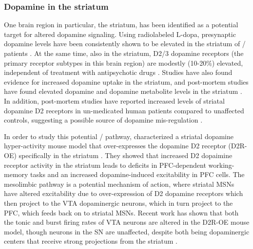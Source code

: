 

\subsubsection{Dopamine in the striatum}
One brain region in particular, the striatum, has been identified as a potential target for altered dopamine signaling.
Using radiolabeled L-dopa, presynaptic dopamine levels have been consistently shown to be elevated in the striatum of \scz/ patients \citep[reviewed in][]{Howes2007}.
At the same time, also in the striatum, D2/3 dopamine receptors (the primary receptor subtypes in this brain region) are modestly (10-20\%) elevated, independent of treatment with antipsychotic drugs \citep[reviewed in][]{Howes2009}.
Studies have also found evidence for increased dopamine uptake in the striatum, and post-mortem studies have found elevated dopamine and dopamine metabolite levels in the striatum \citep{Simpson2010}.
In addition, post-mortem studies have reported increased levels of striatal dopamine D2 receptors in un-medicated human patients compared to unaffected controls, suggesting a possible source of dopamine mis-regulation \citep{Cross1981}.

In order to study this potential \scz/ pathway, \citeauthor{Kellendonk2006} characterized a striatal dopamine hyper-activity mouse model that over-expresses the dopamine D2 receptor (D2R-OE) specifically in the striatum \citep{Kellendonk2006}.
They showed that increased D2 dopaimine receptor activity in the striatum leads to deficits in \ac{PFC}-dependent working-memory tasks and an increased dopamine-induced excitability in \ac{PFC} cells.
The mesolimbic pathway is a potential mechanism of action, where striatal \acp{MSN} have altered excitability due to over-expression of D2 dopamine receptors which then project to the \ac{VTA} dopaminergic neurons, which in turn project to the \ac{PFC}, which feeds back on to striatal \acp{MSN}.
Recent work has shown that both the tonic and burst firing rates of \ac{VTA} neurons are altered in the D2R-OE mouse model, though neurons in the \acl{SN} are unaffected, despite both being dopaminergic centers that receive strong projections from the striatum \citep{Krabbe2015}.


